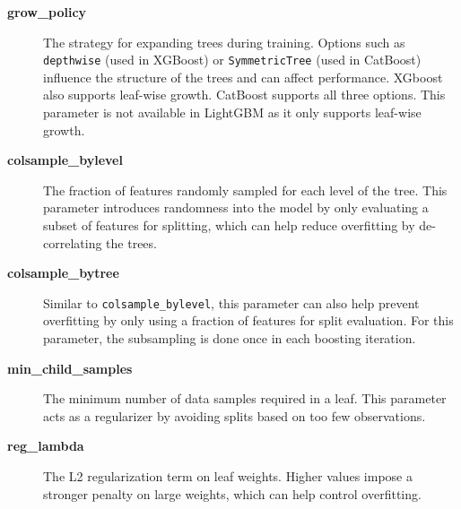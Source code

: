 \begin{description}
  \item[\textbf{grow\_policy}] The strategy for expanding trees during training. Options such as \texttt{depthwise} (used in XGBoost) or \texttt{SymmetricTree} (used in CatBoost) influence the structure of the trees and can affect performance. XGboost also supports leaf-wise growth. CatBoost supports all three options. This parameter is not available in LightGBM as it only supports leaf-wise growth.
  
  \item[\textbf{colsample\_bylevel}] The fraction of features randomly sampled for each level of the tree. This parameter introduces randomness into the model by only evaluating a subset of features for splitting, which can help reduce overfitting by de-correlating the trees.
  
  \item[\textbf{colsample\_bytree}] Similar to \texttt{colsample\_bylevel}, this parameter can also help prevent overfitting by only using a fraction of features for split evaluation. For this parameter, the subsampling is done once in each boosting iteration.

  \item[\textbf{min\_child\_samples}] The minimum number of data samples required in a leaf. This parameter acts as a regularizer by avoiding splits based on too few observations.
  
  \item[\textbf{reg\_lambda}] The L2 regularization term on leaf weights. Higher values impose a stronger penalty on large weights, which can help control overfitting.
  
\end{description}


